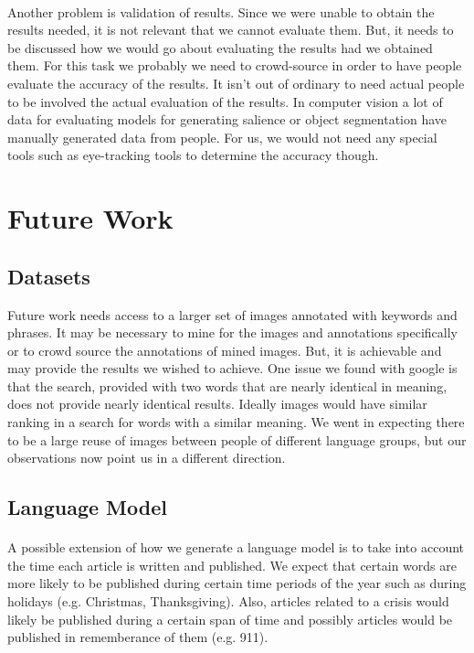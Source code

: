 \documentclass[12pt]{article}
\begin{document}
\paragraph{}
Another problem is validation of results. Since we were unable to obtain the results needed, it is not relevant
that we cannot evaluate them. But, it needs to be discussed how we would go about evaluating the results had 
we obtained them. For this task we probably we need to crowd-source in order to have people evaluate the accuracy 
of the results. It isn't out of ordinary to need actual people to be involved the actual evaluation of the results. 
In computer vision a lot of data for evaluating models for generating salience or object segmentation have manually 
generated data from people. For us, we would not need any special tools such as eye-tracking tools to determine 
the accuracy though.

\section{Future Work}
\subsection{Datasets}
Future work needs access to a larger set of images annotated with keywords and phrases. It may be necessary to mine 
for the images and annotations specifically or to crowd source the annotations of mined images. But, it is achievable 
and may provide the results we wished to achieve. One issue we found with google is that the search, provided with two 
words that are nearly identical in meaning, does not provide nearly identical results. Ideally images would have 
similar ranking in a search for words with a similar meaning. We went in expecting there to be a large reuse of images 
between people of different language groups, but our observations now point us in a different direction.

\subsection{Language Model}
\paragraph{}
A possible extension of how we generate a language model is to take into account the time each article is written and 
published. We expect that certain words are more likely to be published during certain time periods of the year such as 
during holidays (e.g. Christmas, Thanksgiving). Also, articles related to a crisis would likely be published during a 
certain span of time and possibly articles would be published in rememberance of them (e.g. 911).
\end{document}

